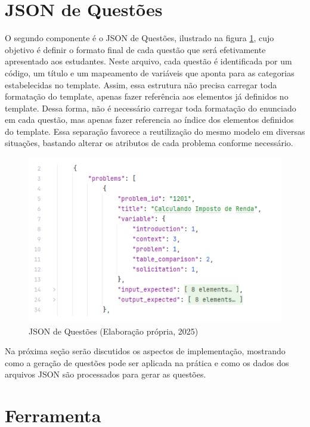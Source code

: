 \section{JSON de Questões}

O segundo componente é o JSON de Questões, ilustrado na figura \ref{fig:json-de-questoes}, cujo objetivo é definir o formato final de cada questão que será efetivamente apresentado aos estudantes. Neste arquivo, cada questão é identificada por um código, um título e um mapeamento de variáveis que aponta para as categorias estabelecidas no template. Assim, essa estrutura não precisa carregar toda formatação do template, apenas fazer referência aos elementos já definidos no template. Dessa forma, não é necessário carregar toda formatação do enunciado em cada questão, mas apenas fazer referencia ao índice dos elementos definidos do template. Essa separação favorece a reutilização do mesmo modelo em diversas situações, bastando alterar os atributos de cada problema conforme necessário.

\begin{figure}[ht]
	\centering
	\includegraphics[width=12cm]{./imagens/capitulo7/json-de-questoes}
	\caption{JSON de Questões (Elaboração própria, 2025) }
	\label{fig:json-de-questoes}
\end{figure}
Na próxima seção serão discutidos os aspectos de implementação, mostrando como a geração de questões pode ser aplicada na prática e como os dados dos arquivos JSON são processados para gerar  as questões.

\section{Ferramenta}

